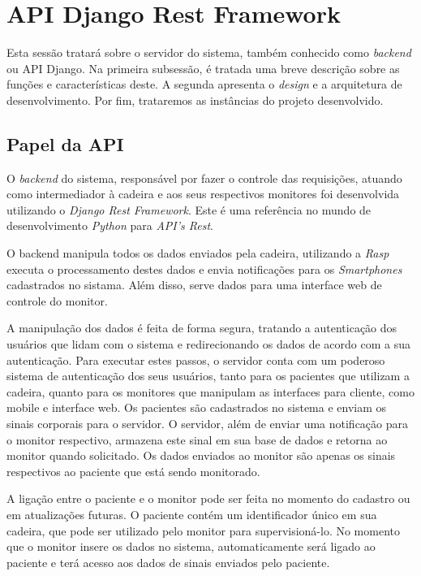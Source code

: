 \section{API Django Rest Framework}
Esta sessão tratará sobre o servidor do sistema, também conhecido como \textit{backend}
ou API Django. Na primeira subsessão, é tratada uma breve descrição sobre as funções
e características deste. A segunda apresenta o \textit{design} e a arquitetura
de desenvolvimento. Por fim, trataremos as instâncias do projeto desenvolvido.


\subsection{Papel da API}
\label{sub:papel_da_api}
O \textit{backend} do sistema, responsável por fazer o controle das requisições,
atuando como intermediador à cadeira e aos seus respectivos monitores   
foi desenvolvida utilizando o \textit{Django Rest Framework}. Este é uma
referência no mundo de desenvolvimento \textit{Python} para \textit{API's Rest}.

O backend manipula todos os dados enviados pela cadeira, utilizando a \textit{Rasp}
executa o processamento destes dados e envia notificações para os \textit{Smartphones}
cadastrados no sistama. Além disso, serve dados para uma interface web de controle
do monitor.

A manipulação dos dados é feita de forma segura, tratando a autenticação dos usuários
que lidam com o sistema e redirecionando os dados de acordo com a sua autenticação.
Para executar estes passos, o servidor conta com um poderoso sistema de autenticação
dos seus usuários, tanto para os pacientes que utilizam a cadeira, quanto para os
monitores que manipulam as interfaces para cliente, como mobile e interface web.
Os pacientes são cadastrados no sistema e enviam os sinais corporais para o servidor.
O servidor, além de enviar uma notificação para o monitor respectivo, armazena este
sinal em sua base de dados e retorna ao monitor quando solicitado.
Os dados enviados ao monitor são apenas os sinais respectivos ao paciente que está
sendo monitorado.

A ligação entre o paciente e o monitor pode ser feita no momento do cadastro ou em
atualizações futuras. O paciente contém um identificador único em sua cadeira, que
pode ser utilizado pelo monitor para supervisioná-lo. No momento que o monitor insere
os dados no sistema, automaticamente será ligado ao paciente e terá acesso aos dados
de sinais enviados pelo paciente.

